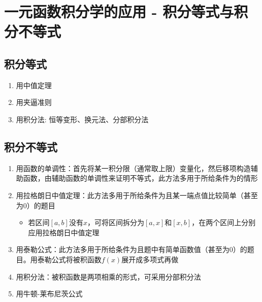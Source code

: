 \documentclass[a4paper,12pt]{article}
\newcommand{\blueuline}[1]{{\color{blue}\uline{\color{black}{#1}}}}
\begin{document}



    \section{一元函数积分学的应用 - 积分等式与积分不等式}

    \subsection{积分等式}

    \begin{enumerate}
        \item 用中值定理
        \item 用夹逼准则
        \item 用积分法: 恒等变形、换元法、分部积分法
    \end{enumerate}

    \subsection{积分不等式}

    \begin{enumerate}
        \item 用函数的单调性：首先将某一积分限（通常取上限）变量化，然后移项构造辅助函数，由辅助函数的单调性来证明不等式，此方法多用于所给条件为\textbf{\blueuline{$f(x)$在$[a, b]$上连续}}的情形
        \item 用拉格朗日中值定理：此方法多用于所给条件为\textbf{\blueuline{$f(x)$一阶可导}}且某一端点值比较简单（甚至为$0$）的题目
        \begin{itemize}
            \item 若区间$[a, b]$没有$x$，可将区间拆分为$[a, x]$和$[x, b]$，在两个区间上分别应用拉格朗日中值定理
        \end{itemize}
        \item 用泰勒公式：此方法多用于所给条件为\textbf{\blueuline{$f(x)$二阶可导}}且题中有简单函数值（甚至为$0$）的题目。用泰勒公式将被积函数$f(x)$展开成多项式再做
        \item 用积分法：被积函数是两项相乘的形式，可采用分部积分法
        \item 用牛顿-莱布尼茨公式
    \end{enumerate}
\end{document}
